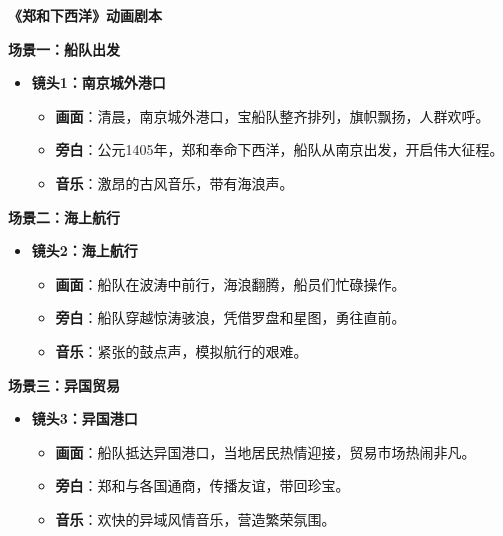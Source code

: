 \begin{gptbox}
\small{
  \textbf{《郑和下西洋》动画剧本}

  \textbf{场景一：船队出发}
  \begin{itemize}
      \item \textbf{镜头1：南京城外港口}
      \begin{itemize}
          \item \textbf{画面}：清晨，南京城外港口，宝船队整齐排列，旗帜飘扬，人群欢呼。
          \item \textbf{旁白}：公元1405年，郑和奉命下西洋，船队从南京出发，开启伟大征程。
          \item \textbf{音乐}：激昂的古风音乐，带有海浪声。
      \end{itemize}
  \end{itemize}
  
  \textbf{场景二：海上航行}
  \begin{itemize}
      \item \textbf{镜头2：海上航行}
      \begin{itemize}
          \item \textbf{画面}：船队在波涛中前行，海浪翻腾，船员们忙碌操作。
          \item \textbf{旁白}：船队穿越惊涛骇浪，凭借罗盘和星图，勇往直前。
          \item \textbf{音乐}：紧张的鼓点声，模拟航行的艰难。
      \end{itemize}
  \end{itemize}
  
  \textbf{场景三：异国贸易}
  \begin{itemize}
      \item \textbf{镜头3：异国港口}
      \begin{itemize}
          \item \textbf{画面}：船队抵达异国港口，当地居民热情迎接，贸易市场热闹非凡。
          \item \textbf{旁白}：郑和与各国通商，传播友谊，带回珍宝。
          \item \textbf{音乐}：欢快的异域风情音乐，营造繁荣氛围。
      \end{itemize}
  \end{itemize}

}
\end{gptbox}


